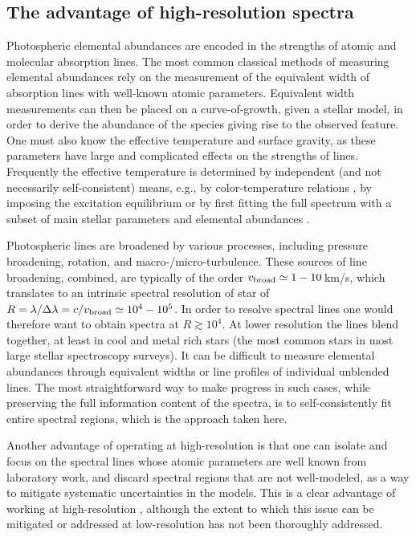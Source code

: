 \documentclass[iop]{emulateapj}
\begin{document}
\begin{CJK*}{UTF8}{gbsn}
%
%
%
%
%
%

\subsection{The advantage of high-resolution spectra}
\label{sec:why-high-res}

Photospheric elemental abundances are encoded in the strengths of atomic and molecular absorption lines. The most common classical methods of measuring elemental abundances rely on the measurement of the equivalent width of absorption lines with well-known atomic parameters. Equivalent width measurements can then be placed on a curve-of-growth, given a stellar model, in order to derive the abundance of the species giving rise to the observed feature. One must also know the effective temperature and surface gravity, as these parameters have large and complicated effects on the strengths of lines. Frequently the effective temperature is determined by independent (and not necessarily self-consistent) means, e.g., by color-temperature relations \citep[e.g.,][]{cas11},  by imposing the excitation equilibrium or by first fitting the full spectrum with a subset of main stellar parameters and elemental abundances \citep[e.g.][]{gar16}.

Photospheric lines are broadened by various processes, including pressure broadening, rotation, and macro-/micro-turbulence. These sources of line broadening, combined, are typically of the order $v_{\rm broad} \simeq 1-10\,$km/s, which translates to an intrinsic spectral resolution of star of $R=\lambda/\Delta \lambda = c/v_{\rm broad} \simeq 10^4-10^5$. In order to resolve spectral lines one would therefore want to obtain spectra at $R \gtrsim 10^4$. At lower resolution the lines blend together, at least in cool and metal rich stars (the most common stars in most large stellar spectroscopy surveys). It can be difficult to measure elemental abundances through equivalent widths or line profiles of individual unblended lines. The most straightforward way to make progress in such cases, while preserving the full information content of the spectra, is to self-consistently fit entire spectral regions, which is the approach taken here.

Another advantage of operating at high-resolution is that one can isolate and focus on the spectral lines whose atomic parameters are well known from laboratory work, and discard spectral regions that are not well-modeled, as a way to mitigate systematic uncertainties in the models. This is a clear advantage of working at high-resolution \citep[but see also][]{cze15}, although the extent to which this issue can be mitigated or addressed at low-resolution has not been thoroughly addressed.


\end{CJK*}
\end{document}
